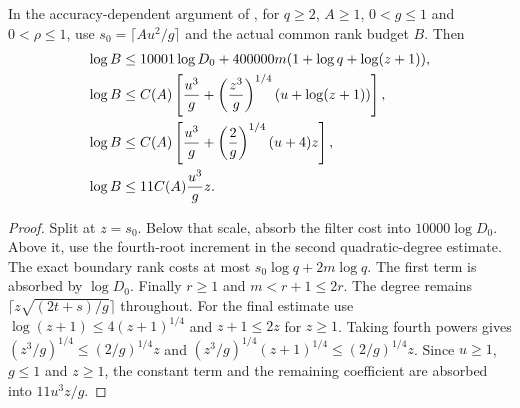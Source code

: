 \begin{lemma}
    \label{thm:aklv_accuracy_fourth_root_log_rank}
    \leanok
    In the accuracy-dependent argument of \cite[Section~7]{Arad2013AreaLaw},
    for $q\ge2$, $A\ge1$, $0<g\le1$ and $0<\rho\le1$, use
    $s_0=\lceil Au^2/g\rceil$ and the actual common rank budget $B$.
    Then
    \begin{align*}
        \log B & \le10001\log D_0+
        400000m(1+\log q+\log(z+1)),\notag                 \\
        \log B & \le C(A)\left[\frac{u^3}{g}+
            \left(\frac{z^3}{g}\right)^{1/4}
        (u+\log(z+1))\right],\notag                        \\
        \log B & \le C(A)\left[\frac{u^3}{g}+
        \left(\frac{2}{g}\right)^{1/4}(u+4)z\right],\notag \\
        \log B & \le 11C(A)\frac{u^3}{g}z.
    \end{align*}
\end{lemma}
\begin{proof}
    \leanok
    Split at $z=s_0$. Below that scale, absorb the filter cost into
    $10000\log D_0$. Above it, use the fourth-root increment in the
    second quadratic-degree estimate. The exact boundary rank costs at
    most $s_0\log q+2m\log q$. The first term is absorbed by
    $\log D_0$. Finally $r\ge1$ and $m<r+1\le2r$.
    The degree remains $\lceil z\sqrt{(2t+s)/g}\rceil$ throughout.
    For the final estimate use
    $\log(z+1)\le4(z+1)^{1/4}$ and $z+1\le2z$ for $z\ge1$.
    Taking fourth powers gives
    $(z^3/g)^{1/4}\le(2/g)^{1/4}z$ and
    $(z^3/g)^{1/4}(z+1)^{1/4}\le(2/g)^{1/4}z$.
    Since $u\ge1$, $g\le1$ and $z\ge1$, the constant term and the
    remaining coefficient are absorbed into $11u^3z/g$.
\end{proof}

